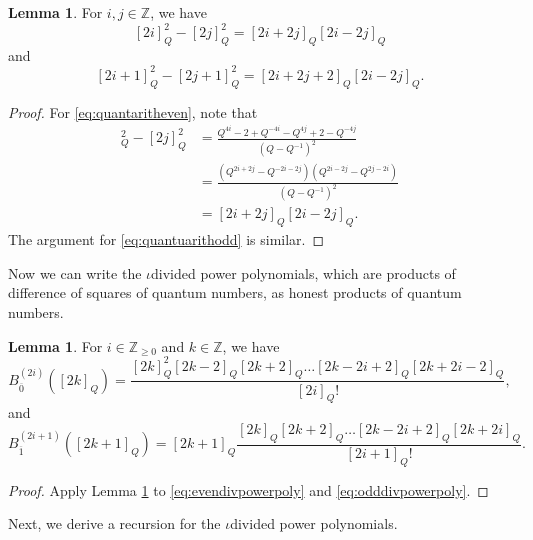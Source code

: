 \documentclass[10pt]{amsart}
\numberwithin{equation}{section}
\theoremstyle{definition}
\newtheorem{lemma}[theorem]{Lemma}
\begin{document}
\begin{lemma}\label{lem:quantumarith}
    For $i,j\in \mathbb{Z}$, we have
\begin{equation}\label{eq:quantaritheven}
    [2i]_Q^2-[2j]_Q^2=[2i+2j]_Q[2i-2j]_Q
\end{equation}
and
\begin{equation}\label{eq:quantuarithodd}
    [2i+1]_Q^2-[2j+1]^2_Q=[2i+2j+2]_Q[2i-2j]_Q.
\end{equation}
\end{lemma}
\begin{proof}
    For \eqref{eq:quantaritheven}, note that
    \begin{align*}
    [2i]_Q^2-[2j]_Q^2&=\frac{Q^{4i}-2 +Q^{-4i}-Q^{4j}+2 -Q^{-4j}}{(Q-Q^{-1})^2} \\
    &=\frac{(Q^{2i+2j}-Q^{-2i-2j})(Q^{2i-2j}-Q^{2j-2i})}{(Q-Q^{-1})^2}\\
    &=[2i+2j]_Q[2i-2j]_Q.
    \end{align*}
    The argument for \eqref{eq:quantuarithodd} is similar.
\end{proof}

Now we can write the $\iota$divided power polynomials, which are products of difference of squares of quantum numbers, as honest products of quantum numbers.

\begin{lemma}
For $i\in \mathbb{Z}_{\ge 0}$ and $k\in \mathbb{Z}$, we have
\begin{equation}
    B_{\overline{0}}^{(2i)}([2k]_Q)=\frac{[2k]_Q^2[2k-2]_Q[2k+2]_Q\dots [2k-2i+2]_Q[2k+2i-2]_Q}{[2i]_Q!},
\end{equation}
and
\begin{equation}
    B_{\overline{1}}^{(2i+1)}([2k+1]_Q)=[2k+1]_Q\frac{[2k]_Q[2k+2]_Q\dots [2k-2i+2]_Q[2k+2i]_Q}{[2i+1]_Q!}.
\end{equation}
\end{lemma}
\begin{proof}
    Apply Lemma \ref{lem:quantumarith} to \eqref{eq:evendivpowerpoly} and \eqref{eq:odddivpowerpoly}. 
\end{proof}

Next, we derive a recursion for the $\iota$divided power polynomials.
\end{document}
